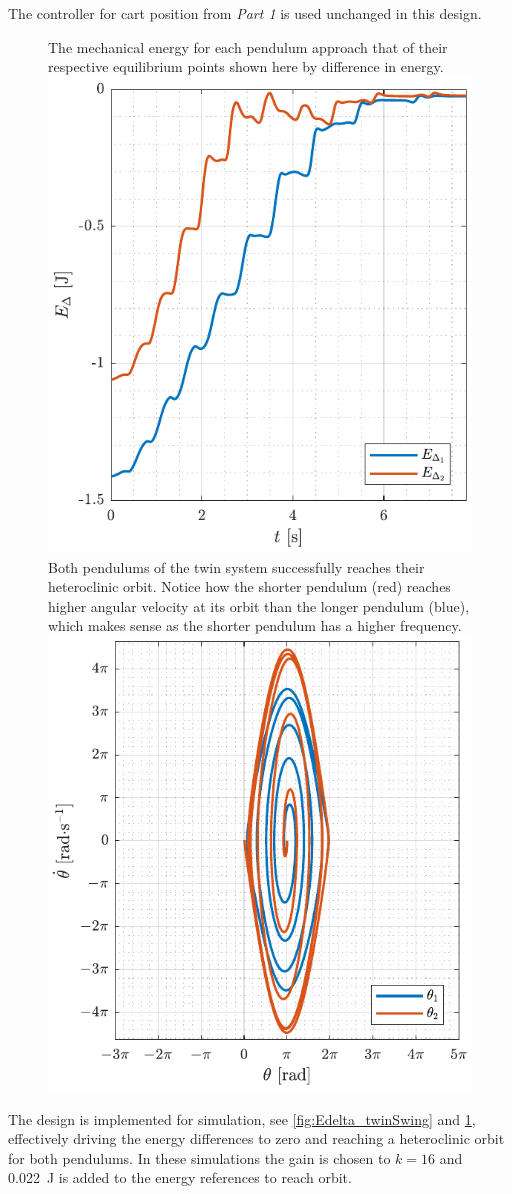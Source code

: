 The controller for cart position from \textit{Part 1} is used unchanged in this design.
%
\begin{figure}[H]
  \hspace{-10pt}
  \captionbox 
  {
    The mechanical energy for each pendulum approach that of their respective equilibrium points shown here by difference in energy.
    \label{fig:Edelta_twinSwing}
  }
  {
    \hspace{-1cm}
    \includegraphics[width=.448\textwidth]{figures/Edelta_twinSwing}
  }
  \hspace{20pt}
  \captionbox 
  {
    Both pendulums of the twin system successfully reaches their heteroclinic orbit. Notice how the shorter pendulum (red) reaches higher angular velocity at its orbit than the longer pendulum (blue), which makes sense as the shorter pendulum has a higher frequency.
    \label{fig:phase_twinSwing}
  }
  {
    \hspace{-1cm}
    \includegraphics[width=.46\textwidth]{figures/phase_twinSwing}
  }
\end{figure}
%
The design is implemented for simulation, see \autoref{fig:Edelta_twinSwing} and \ref{fig:phase_twinSwing}, effectively driving the energy differences to zero and reaching a heteroclinic orbit for both pendulums. In these simulations the gain is chosen to $k=16$ and \SI{.022}{J} is added to the energy references to reach orbit.
